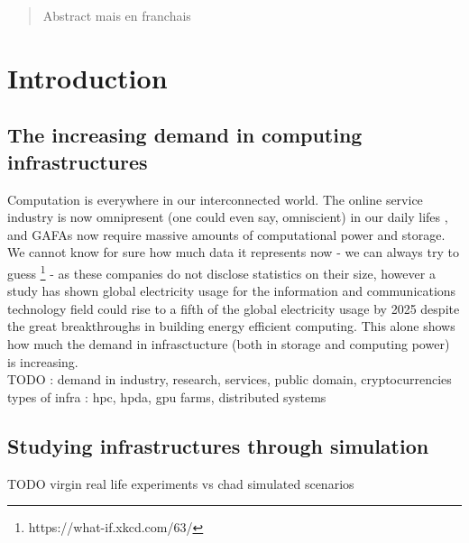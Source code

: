 \documentclass[12pt, a4paper]{memoir}
\begin{document}
\renewcommand\abstractname{R\'esum\'e}
\begin{abstract} 
	Abstract mais en franchais
\end{abstract}

\tableofcontents* %
\normalsize

\mainmatter
\SingleSpace

\chapter{Introduction}
\section{The increasing demand in computing infrastructures}

Computation is everywhere in our interconnected world. The online service
industry is now omnipresent (one could even say, omniscient) in our daily lifes
, and GAFAs now require massive amounts of computational power and storage. We
cannot know for sure how much data it represents now - we can always try to
guess \footnote{https://what-if.xkcd.com/63/} - as these companies do not
disclose statistics on their size, however a study\cite{andrae2017total} has
shown global electricity usage for the information and communications
technology field could rise to a fifth of the global electricity usage by 2025
despite the great breakthroughs in building energy efficient computing. This
alone shows how much the demand in infrasctucture (both in storage and
computing power) is increasing.\\



TODO : 
demand in industry, research, services, public domain, cryptocurrencies
types of infra : hpc, hpda, gpu farms, distributed systems

\section{Studying infrastructures through simulation}
TODO virgin real life experiments vs chad simulated scenarios
\end{document}
